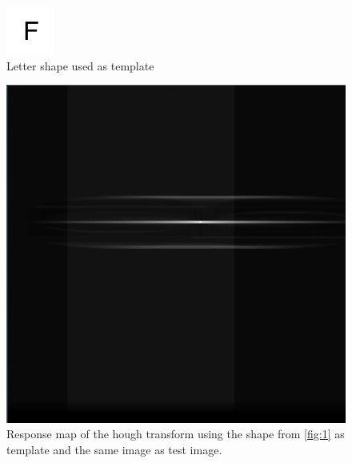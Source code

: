 \documentclass[11pt,a4paper]{article}
\begin{document}
\begin{figure}
\centering
\includegraphics[scale=.4]{img/templateLetter.png}

\caption{Letter shape used as template}
\label{fig:2}
\end{figure}

\begin{figure}
\centering
\includegraphics[scale=.4]{img/mapTemplate.png}

\caption{Response map of the hough transform using the shape from \ref{fig:1} as template and the same image as test image.}
\label{fig:3}
\end{figure}
\end{document}
